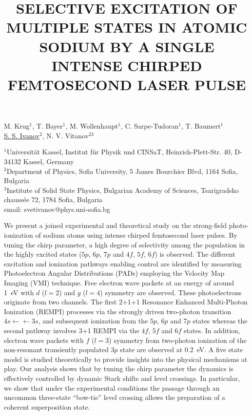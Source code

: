 \title{SELECTIVE EXCITATION OF MULTIPLE STATES IN ATOMIC SODIUM BY A SINGLE INTENSE CHIRPED FEMTOSECOND LASER PULSE}

M. Krug$^1$, T. Bayer$^1$, M. Wollenhaupt$^1$, C. Sarpe-Tudoran$^1$, T. Baumert$^1$\\
\underline{S. S. Ivanov}$^2$, N. V. Vitanov$^{23}$


$^1$Universit\"at Kassel, Institut f\"ur Physik und CINSaT, Heinrich-Plett-Str. 40, D-34132 Kassel, Germany\\
$^2$Department of Physics, Sofia University, 5 James Bourchier Blvd, 1164 Sofia, Bulgaria\\
$^3$Institute of Solid State Physics, Bulgarian Academy of Sciences, Tsarigradsko chauss\'{e}e 72, 1784 Sofia, Bulgaria\\
email: svetivanov@phys.uni-sofia.bg

We present a joined experimental and theoretical study on the
strong-field photo-ionization of sodium atoms using intense chirped
femtosecond laser pulses. By tuning the chirp parameter, a high
degree of selectivity among the population in the highly excited
states ($5p$, $6p$, $7p$ and $4f$, $5f$, $6f$) is observed. The
different excitation and ionization pathways enabling control are
identified by measuring Photoelectron Angular Distributions (PADs)
employing the Velocity Map Imaging (VMI) technique.  Free electron
wave packets at an energy of around 1~eV with $d$ ($l=2$) and $g$
($l=4$) symmetry are observed. These photoelectrons originate from
two channels. The first 2+1+1 Resonance Enhanced Multi-Photon
Ionization (REMPI) processes via the strongly driven two-photon
transition $4s \leftarrow\leftarrow3s$, and subsequent
ionization from the $5p$, $6p$ and $7p$ states whereas the second pathway
involves 3+1 REMPI via the $4f$, $5f$ and $6f$ states. In addition,
electron wave packets with $f$ ($l=3$) symmetry from two-photon
ionization of the non-resonant transiently populated $3p$ state are
observed at 0.2~eV. A five state model is studied theoretically to
provide insights into the physical mechanisms at play. Our analysis
shows that by tuning the chirp parameter the dynamics is effectively
controlled by dynamic Stark shifts and level crossings.  In
particular, we show that under the experimental conditions the
passage through an uncommon three-state ``bow-tie'' level
crossing allows the preparation of a coherent superposition state.

\vspace{\baselineskip}